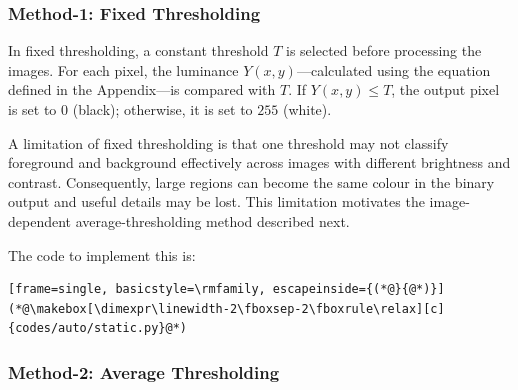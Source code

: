 \subsubsection{Method-1: Fixed Thresholding}
\startimplementationimages

In fixed thresholding, a constant threshold $T$ is selected before processing the images. For each pixel, the luminance $Y(x,y)$—calculated using the equation defined in the Appendix—is compared with $T$. If $Y(x,y)\leq T$, the output pixel is set to $0$ (black); otherwise, it is set to $255$ (white).

A limitation of fixed thresholding is that one threshold may not classify foreground and background effectively across images with different brightness and contrast. Consequently, large regions can become the same colour in the binary output and useful details may be lost. This limitation motivates the image-dependent average-thresholding method described next.

\begin{center}
\hfill
{}\par\vspace{0.6em}
\hfill
{}\par\vspace{0.6em}
\hfill
{}\par\vspace{0.6em}
\hfill
{}
\end{center}

The code to implement this is:
\begin{lstlisting}[frame=single, basicstyle=\rmfamily, escapeinside={(*@}{@*)}]
(*@\makebox[\dimexpr\linewidth-2\fboxsep-2\fboxrule\relax][c]{codes/auto/static.py}@*)
\end{lstlisting}

\subsubsection{Method-2: Average Thresholding}
\startimplementationimages

